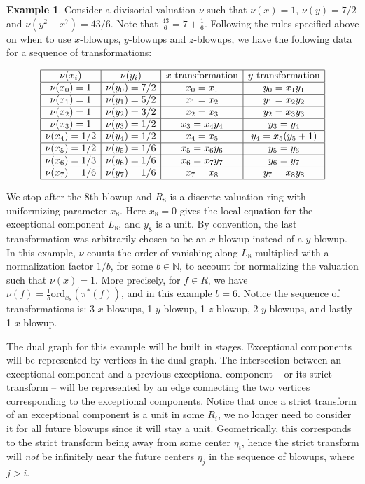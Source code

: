 \documentclass[11pt]{amsart}
\theoremstyle{definition}
\newtheorem{ex}[thm]{Example}
\begin{document}
\begin{ex} \label{dgex} Consider a divisorial valuation $\nu$ such that $\nu(x)=1$, $\nu(y)=7/2$ and $\nu(y^2-x^{7})=43/6$. Note that $\displaystyle \frac{43}{6} = 7 + \frac{1}{6}$. Following the rules specified above on when to use $x$-blowups, $y$-blowups and $z$-blowups, we have the following data for a sequence of transformations:

\begin{equation*}
\begin{array}{|c|c|c|c|}
\hline
\nu(x_i) & \nu(y_i) & x \text{ transformation} & y \text{ transformation} \\ \hline
\nu(x_0)=1 & \nu(y_0)=7/2 & x_0=x_1 & y_0=x_1y_1 \\ \hline
\nu(x_1)=1 & \nu(y_1)=5/2 & x_1=x_2 & y_1=x_2y_2 \\ \hline
\nu(x_2)=1 & \nu(y_2)=3/2 & x_2=x_3 & y_2=x_3y_3 \\ \hline
\nu(x_3)=1 & \nu(y_3)=1/2 & x_3=x_4y_4 & y_3=y_4 \\ \hline
\nu(x_4)=1/2 & \nu(y_4)=1/2 & x_4=x_5 & y_4=x_5(y_5+1) \\ \hline
\nu(x_5)=1/2 & \nu(y_5)=1/6 & x_5=x_6y_6 & y_5=y_6 \\ \hline
\nu(x_6)=1/3 & \nu(y_6)=1/6 & x_6=x_7y_7 & y_6=y_7 \\ \hline
\nu(x_7)=1/6 & \nu(y_7)=1/6 & x_7=x_8 & y_7=x_8y_8 \\ \hline
\end{array}
\end{equation*}
\end{ex}

We stop after the 8th blowup and $R_8$ is a discrete valuation ring with uniformizing parameter $x_8$. Here $x_8=0$ gives the local equation for the exceptional component $L_8$, and $y_8$ is a unit. By convention, the last transformation was arbitrarily chosen to be an $x$-blowup instead of a $y$-blowup. In this example, $\nu$ counts the order of vanishing along $L_8$ multiplied with a normalization factor $1/b$, for some $b\in\mathbb{N}$, to account for normalizing the valuation such that $\nu(x)=1$. More precisely, for $f\in R$, we have $\displaystyle \nu(f)=\frac{1}{b}\text{ord}_{x_8}\left(\pi^{*}(f)\right)$, and in this example $b=6$. Notice the sequence of transformations is: 3 $x$-blowups, 1 $y$-blowup, 1 $z$-blowup, 2 $y$-blowups, and lastly 1 $x$-blowup.

The dual graph for this example will be built in stages. Exceptional components will be represented by vertices in the dual graph. The intersection between an exceptional component and a previous exceptional component -- or its strict transform -- will be represented by an edge connecting the two vertices corresponding to the exceptional components. Notice that once a strict transform of an exceptional component is a unit in some $R_i$, we no longer need to consider it for all future blowups since it will stay a unit. Geometrically, this corresponds to the strict transform being away from some center $\eta_i$, hence the strict transform will {\it not} be infinitely near the future centers $\eta_j$ in the sequence of blowups, where $j>i$.
\end{document}

